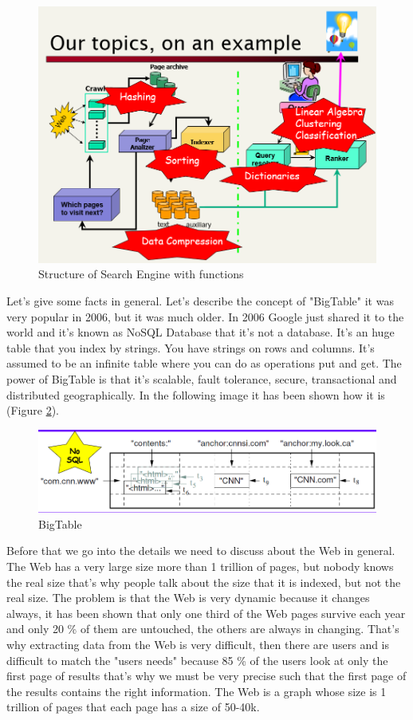 \begin{figure}
    \centering
    \includegraphics[width=0.75\linewidth]{images/functionsearchengine.png}
    \caption{Structure of Search Engine with functions}
    \label{fig:functionssearch}
\end{figure}
Let's give some facts in general. Let's describe the concept of "BigTable" it was very popular in 2006, but it was much older. In 2006 Google just shared it to the world and it's known as NoSQL Database that it's not a database. It's an huge table that you index by strings. You have strings on rows and columns. It's assumed to be an infinite table where you can do as operations put and get. The power of BigTable is that it's scalable, fault tolerance, secure, transactional and distributed geographically. In the following image it has been shown how it is (Figure \ref{fig:bigtable}).
\begin{figure}
    \centering
    \includegraphics[width=0.75\linewidth]{images/nosql.png}
    \caption{BigTable}
    \label{fig:bigtable}
\end{figure}
Before that we go into the details we need to discuss about the Web in general. The Web has a very large size more than 1 trillion of pages, but nobody knows the real size that's why people talk about the size that it is indexed, but not the real size.\newline
The problem is that the Web is very dynamic because it changes always, it has been shown that only one third of the Web pages survive each year and only 20 \% of them are untouched, the others are always in changing. That's why extracting data from the Web is very difficult, then there are users and is difficult to match the "users needs" because 85 \% of the users look at only the first page of results that's why we must be very precise such that the first page of the results contains the right information.\newline
The Web is a graph whose size is 1 trillion of pages that each page has a size of 50-40k.
